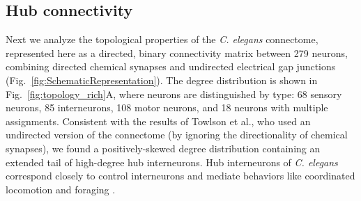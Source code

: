 \documentclass[10pt,letterpaper]{article}
\begin{document}


\subsection*{Hub connectivity}


Next we analyze the topological properties of the \emph{C. elegans} connectome, represented here as a directed, binary connectivity matrix between 279 neurons, combining directed chemical synapses and undirected electrical gap junctions (Fig.~\ref{fig:SchematicRepresentation}).
The degree distribution is shown in Fig.~\ref{fig:topology_rich}A, where neurons are distinguished by type: 68 sensory neurons, 85 interneurons, 108 motor neurons, and 18 neurons with multiple assignments.
Consistent with the results of Towlson et al., who used an undirected version of the connectome (by ignoring the directionality of chemical synapses), we found a positively-skewed degree distribution containing an extended tail of high-degree hub interneurons.
Hub interneurons of \emph{C. elegans} correspond closely to control interneurons and mediate behaviors like coordinated locomotion and foraging \cite{tsalik2003}.
\end{document}
